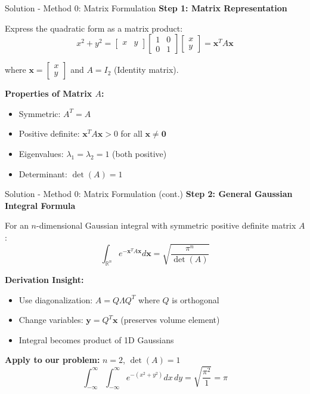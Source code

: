 \documentclass[12pt, aspectratio=169]{beamer}
\begin{document}
\begin{frame}{Solution - Method 0: Matrix Formulation}
\textbf{Step 1: Matrix Representation}

Express the quadratic form as a matrix product:
\[
x^2 + y^2 =
\begin{bmatrix} x & y \end{bmatrix}
\begin{bmatrix} 1 & 0 \\ 0 & 1 \end{bmatrix}
\begin{bmatrix} x \\ y \end{bmatrix}
= \bm{x}^T A \bm{x}
\]

where $\bm{x} = \begin{bmatrix} x \\ y \end{bmatrix}$ and $A = I_2$ (Identity matrix).

\vspace{0.2cm}

\textbf{Properties of Matrix $A$:}
\begin{itemize}
    \item Symmetric: $A^T = A$
    \item Positive definite: $\bm{x}^T A \bm{x} > 0$ for all $\bm{x} \neq \bm{0}$
    \item Eigenvalues: $\lambda_1 = \lambda_2 = 1$ (both positive)
    \item Determinant: $\det(A) = 1$
\end{itemize}
\end{frame}

\begin{frame}{Solution - Method 0: Matrix Formulation (cont.)}
\textbf{Step 2: General Gaussian Integral Formula}

For an $n$-dimensional Gaussian integral with symmetric positive definite matrix $A$:
\[
\int_{\mathbb{R}^n} e^{-\bm{x}^T A \bm{x}} d\bm{x}
= \sqrt{\frac{\pi^n}{\det(A)}}
\]

\textbf{Derivation Insight:}
\begin{itemize}
    \item Use diagonalization: $A = Q\Lambda Q^T$ where $Q$ is orthogonal
    \item Change variables: $\bm{y} = Q^T\bm{x}$ (preserves volume element)
    \item Integral becomes product of 1D Gaussians
\end{itemize}

\vspace{0.2cm}

\textbf{Apply to our problem:} $n = 2$, $\det(A) = 1$
\[
\int_{-\infty}^{\infty} \int_{-\infty}^{\infty}
e^{-(x^2 + y^2)} dx\,dy = \sqrt{\frac{\pi^2}{1}} = \pi
\]
\end{frame}
\end{document}
